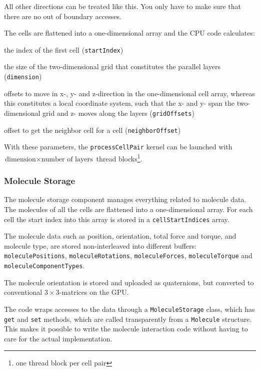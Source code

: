 All other directions can be treated like this. You only have to make sure that there are no out of boundary accesses.

The cells are flattened into a one-dimensional array and the CPU code calculates:
\begin{compactitem}
\item the index of the first cell (\lstinline!startIndex!)
\item the size of the two-dimensional grid that constitutes the parallel layers (\lstinline!dimension!)
\item offsets to move in x-, y- and z-direction in the one-dimensional cell array, whereas this constitutes a local coordinate system, such that the x- and y- span the two-dimensional grid and z- moves along the layers (\lstinline!gridOffsets!)
\item offset to get the neighbor cell for a cell (\lstinline!neighborOffset!)
\end{compactitem}
With these parameters, the \lstinline!processCellPair! kernel can be launched with $ \text{dimension} \times     \text{number of layers} $ thread blocks\footnote{one thread block per cell pair}.

\subsubsection{Molecule Storage}
The molecule storage component manages everything related to molecule data. The molecules of all the cells are flattened into a one-dimensional array. For each cell the start index into this array is stored in a \lstinline!cellStartIndices! array. 

The molecule data such as position, orientation, total force and torque, and molecule type, are stored non-interleaved into different buffers: \lstinline!moleculePositions!, \lstinline!moleculeRotations!, \lstinline!moleculeForces!, \lstinline!moleculeTorque! and \lstinline!moleculeComponentTypes!.

The molecule orientation is stored and uploaded as quaternions, but converted to conventional $ 3 \times 3 $-matrices on the GPU.

The \cuda{} code wraps accesses to the data through a \lstinline!MoleculeStorage! class, which has \lstinline!get! and \lstinline!set! methods, which are called transparently from a \lstinline!Molecule! structure. This makes it possible to write the molecule interaction code without having to care for the actual implementation.

